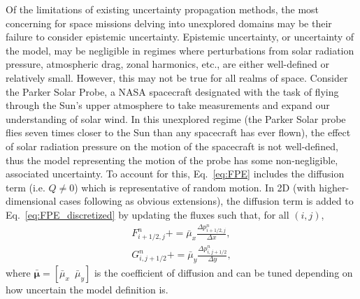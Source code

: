 \documentclass[paper,11pt]{AAS}
\begin{document}
Of the limitations of existing uncertainty propagation methods, the most concerning for space missions delving into unexplored domains may be their failure to consider epistemic uncertainty. Epistemic uncertainty, or uncertainty of the model, may be negligible in regimes where perturbations from solar radiation pressure, atmospheric drag, zonal harmonics, etc., are either well-defined or relatively small. However, this may not be true for all realms of space. Consider the Parker Solar Probe\cite{Parker}, a NASA spacecraft designated with the task of flying through the Sun's upper atmosphere to take measurements and expand our understanding of solar wind. In this unexplored regime (the Parker Solar probe flies seven times closer to the Sun than any spacecraft has ever flown), the effect of solar radiation pressure on the motion of the spacecraft is not well-defined, thus the model representing the motion of the probe has some non-negligible, associated uncertainty. To account for this, Eq.~\eqref{eq:FPE} includes the diffusion term (i.e. $Q \neq 0$) which is representative of random motion. In 2D (with higher-dimensional cases following as obvious extensions), the diffusion term is added to Eq.~\eqref{eq:FPE_discretized} by updating the fluxes such that, for all $(i,j)$,
\begin{subequations}
\begin{gather}\label{eq:diffusion_correction}
F^n_{i+1/2,j} += \bar{\mu}_x\frac{\Delta p^n_{i+1/2,j}}{\Delta x}, \\
G^n_{i,j+1/2} += \bar{\mu}_y\frac{\Delta p^n_{i,j+1/2}}{\Delta y},
\end{gather}
\end{subequations}
where $\bar{\boldsymbol{\mu}} = [\bar{\mu}_x \,\,\, \bar{\mu}_y]$ is the coefficient of diffusion and can be tuned depending on how uncertain the model definition is. %
\end{document}
